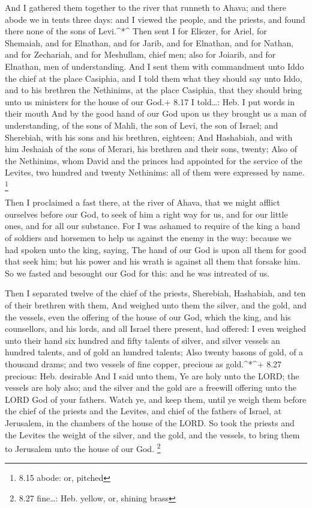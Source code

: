  And I gathered them together to the river that runneth to
Ahava; and there abode we in tents three days: and I viewed the people,
and the priests, and found there none of the sons of Levi.\^{}*\^{}
 Then sent I for Eliezer, for Ariel, for Shemaiah, and for
Elnathan, and for Jarib, and for Elnathan, and for Nathan, and for
Zechariah, and for Meshullam, chief men; also for Joiarib, and for
Elnathan, men of understanding.  And I sent them with
commandment unto Iddo the chief at the place Casiphia, and I told them
what they should say unto Iddo, and to his brethren the Nethinims, at
the place Casiphia, that they should bring unto us ministers for the
house of our God.+ 8.17 I told\ldots: Heb. I put words in their mouth
 And by the good hand of our God upon us they brought us a
man of understanding, of the sons of Mahli, the son of Levi, the son of
Israel; and Sherebiah, with his sons and his brethren, eighteen;
 And Hashabiah, and with him Jeshaiah of the sons of
Merari, his brethren and their sons, twenty;  Also of the
Nethinims, whom David and the princes had appointed for the service of
the Levites, two hundred and twenty Nethinims: all of them were
expressed by name. \footnote{8.15 abode: or, pitched}

 Then I proclaimed a fast there, at the river of Ahava,
that we might afflict ourselves before our God, to seek of him a right
way for us, and for our little ones, and for all our substance.
 For I was ashamed to require of the king a band of
soldiers and horsemen to help us against the enemy in the way: because
we had spoken unto the king, saying, The hand of our God is upon all
them for good that seek him; but his power and his wrath is against all
them that forsake him.  So we fasted and besought our God
for this: and he was intreated of us.

 Then I separated twelve of the chief of the priests,
Sherebiah, Hashabiah, and ten of their brethren with them, 
And weighed unto them the silver, and the gold, and the vessels, even
the offering of the house of our God, which the king, and his
counsellors, and his lords, and all Israel there present, had offered:
 I even weighed unto their hand six hundred and fifty
talents of silver, and silver vessels an hundred talents, and of gold an
hundred talents;  Also twenty basons of gold, of a thousand
drams; and two vessels of fine copper, precious as gold.\^{}*\^{}+ 8.27
precious: Heb. desirable  And I said unto them, Ye are holy
unto the LORD; the vessels are holy also; and the silver and the gold
are a freewill offering unto the LORD God of your fathers. 
Watch ye, and keep them, until ye weigh them before the chief of the
priests and the Levites, and chief of the fathers of Israel, at
Jerusalem, in the chambers of the house of the LORD.  So
took the priests and the Levites the weight of the silver, and the gold,
and the vessels, to bring them to Jerusalem unto the house of our God.
\footnote{8.27 fine\ldots: Heb. yellow, or, shining brass}


